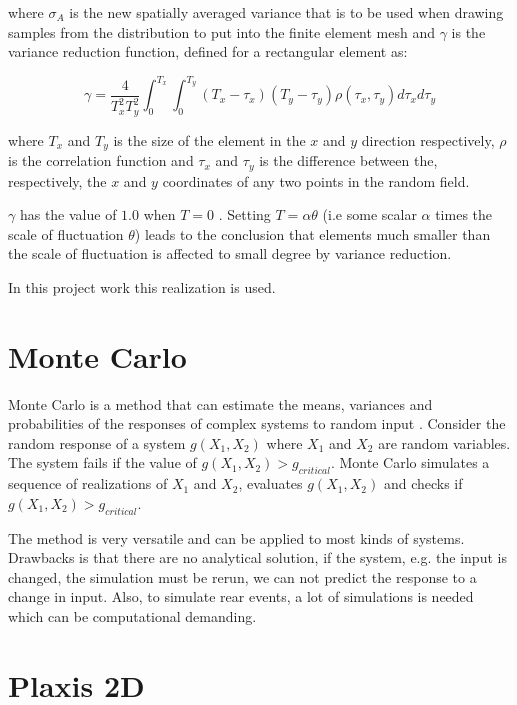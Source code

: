 where $\sigma_A$ is the new spatially averaged variance that is to be used when drawing samples from the distribution to put into the finite element mesh and $\gamma$ is the variance reduction function, defined for a rectangular element as:

\begin{equation}
\label{eq3.42}
	\gamma = \frac{4}{T_x^2 T_y^2} \int_0^{T_x} \int_0^{T_y} (T_x-\tau_x)(T_y-\tau_y)\rho(\tau_x,\tau_y)d\tau_xd\tau_y
\end{equation}

where $T_x$ and $T_y$ is the size of the element in the $x$ and $y$ direction respectively, $\rho$ is the correlation function and $\tau_x$ and $\tau_y$ is the difference between the, respectively, the $x$ and $y$ coordinates of any two points in the random field.

$\gamma$ has the value of $1.0$ when $T=0$ \citep[see][chapter 3]{fenton2008risk}. Setting \(T=\alpha \theta\) (i.e some scalar $\alpha$ times the scale of fluctuation $\theta$) leads to the conclusion that elements much smaller than the scale of fluctuation is affected to small degree by variance reduction.

In this project work this realization is used.

\section{Monte Carlo}

Monte Carlo is a method that can estimate the means, variances and probabilities of the responses of complex systems to random input \citep[see][chapter 6.6]{fenton2008risk}. 
Consider the random response of a system $g(X_1,X_2)$ where $X_1$ and $X_2$ are random variables. The system fails if the value of $g(X_1,X_2) > g_{critical}$. Monte Carlo simulates a sequence of realizations of $X_1$ and $X_2$,  evaluates $g(X_1,X_2)$ and checks if $g(X_1,X_2) > g_{critical}$. 

The method is very versatile and can be applied to most kinds of systems. 
Drawbacks is that there are no analytical solution, if the system, e.g. the input is changed, the simulation must be rerun, we can not predict the response to a change in input. 
Also, to simulate rear events, a lot of simulations is needed which can be computational demanding.

\section{Plaxis 2D}

